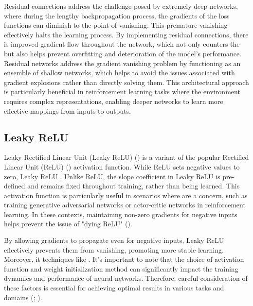 \noindent Residual connections address the challenge posed by extremely deep networks, where during the lengthy backpropagation process, the gradients of the loss functions can diminish to the point of vanishing. This premature vanishing effectively halts the learning process. By implementing residual connections, there is improved gradient flow throughout the network, which not only counters the  but also helps prevent overfitting and deterioration of the model's performance. Residual networks address the gradient vanishing problem by functioning as an ensemble of shallow networks, which helps to avoid the issues associated with gradient explosions rather than directly solving them. This architectural approach is particularly beneficial in reinforcement learning tasks where the environment requires complex representations, enabling deeper networks to learn more effective mappings from inputs to outputs.

\subsection{Leaky ReLU}
\label{subsec:leaky-relu}

\noindent Leaky Rectified Linear Unit (Leaky ReLU) (\cite{xu2015empirical}) is a variant of the popular Rectified Linear Unit (ReLU) (\cite{agarap2019deep}) activation function. While ReLU sets negative values to zero, Leaky ReLU . Unlike ReLU, the slope coefficient in Leaky ReLU is pre-defined and remains fixed throughout training, rather than being learned. This activation function is particularly useful in scenarios where  are a concern, such as training generative adversarial networks or actor-critic networks in reinforcement learning. In these contexts, maintaining non-zero gradients for negative inputs helps prevent the issue of "dying ReLU" (\cite{Lu_2020}).

\bigskip

\noindent By allowing gradients to propagate even for negative inputs, Leaky ReLU effectively prevents them from vanishing, promoting more stable learning. Moreover, it  techniques like . It's important to note that the choice of activation function and weight initialization method can significantly impact the training dynamics and performance of neural networks. Therefore, careful consideration of these factors is essential for achieving optimal results in various tasks and domains (\cite{datta2020survey}; \cite{shengyi2022the37implementation}).

